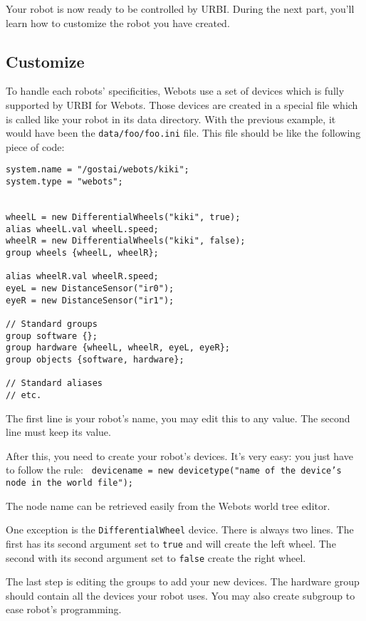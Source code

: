 Your robot is now ready to be controlled by URBI. During the next
part, you'll learn how to customize the robot you have created.


\subsection{Customize}
\label{webots.own.customize}%

To handle each robots' specificities, Webots use a set of devices
which is fully supported by URBI for Webots. Those devices are created
in a special file which is called like your robot in its data
directory. With the previous example, it would have been the
\nolinkurl{data/foo/foo.ini} file. This file should be like the
following piece of code:


\begin{lstlisting}
system.name = "/gostai/webots/kiki";
system.type = "webots";


wheelL = new DifferentialWheels("kiki", true);
alias wheelL.val wheelL.speed;
wheelR = new DifferentialWheels("kiki", false);
group wheels {wheelL, wheelR};

alias wheelR.val wheelR.speed;
eyeL = new DistanceSensor("ir0");
eyeR = new DistanceSensor("ir1");

// Standard groups
group software {};
group hardware {wheelL, wheelR, eyeL, eyeR};
group objects {software, hardware};

// Standard aliases
// etc.
\end{lstlisting}

The first line is your robot's name, you may edit this to any value.
The second line must keep its value.


After this, you need to create your robot's devices. It's very easy:
you just have to follow the rule: \texttt{
  d\-e\-v\-i\-c\-e\-n\-a\-m\-e = n\-e\-w
  d\-e\-v\-i\-c\-e\-t\-y\-p\-e\-(\-"\-n\-a\-m\-e o\-f t\-h\-e
  d\-e\-v\-i\-c\-e\-'\-s n\-o\-d\-e i\-n t\-h\-e w\-o\-r\-l\-d
  f\-i\-l\-e\-"\-)\-;\- }

The node name can be retrieved easily from the Webots world tree
editor.

One exception is the
\texttt{D\-i\-f\-f\-e\-r\-e\-n\-t\-i\-a\-l\-W\-h\-e\-e\-l} device.
There is always two lines. The first has its second argument set to
\texttt{t\-r\-u\-e} and will create the left wheel. The second with
its second argument set to \texttt{f\-a\-l\-s\-e} create the right
wheel.


The last step is editing the groups to add your new devices. The
hardware group should contain all the devices your robot uses. You may
also create subgroup to ease robot's programming.


